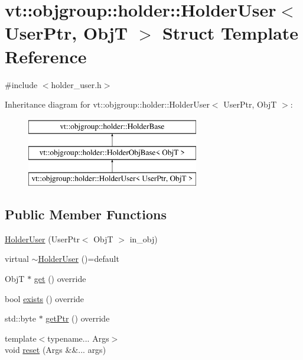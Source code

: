 \hypertarget{structvt_1_1objgroup_1_1holder_1_1_holder_user}{}\section{vt\+:\+:objgroup\+:\+:holder\+:\+:Holder\+User$<$ User\+Ptr, ObjT $>$ Struct Template Reference}
\label{structvt_1_1objgroup_1_1holder_1_1_holder_user}


{\ttfamily \#include $<$holder\+\_\+user.\+h$>$}

Inheritance diagram for vt\+:\+:objgroup\+:\+:holder\+:\+:Holder\+User$<$ User\+Ptr, ObjT $>$\+:\begin{figure}[H]
\begin{center}
\leavevmode
\includegraphics[height=3.000000cm]{structvt_1_1objgroup_1_1holder_1_1_holder_user}
\end{center}
\end{figure}
\subsection*{Public Member Functions}
\begin{DoxyCompactItemize}
\item 
\hyperlink{structvt_1_1objgroup_1_1holder_1_1_holder_user_a5c81ffca6d44450a02c9d74c650d2178}{Holder\+User} (User\+Ptr$<$ ObjT $>$ in\+\_\+obj)
\item 
virtual \hyperlink{structvt_1_1objgroup_1_1holder_1_1_holder_user_a694de38808a7075ef8fa919d9e983c8b}{$\sim$\+Holder\+User} ()=default
\item 
ObjT $\ast$ \hyperlink{structvt_1_1objgroup_1_1holder_1_1_holder_user_a102b494316b9f906a02f1c47b797e339}{get} () override
\item 
bool \hyperlink{structvt_1_1objgroup_1_1holder_1_1_holder_user_abba92cc4a99e045b64a1865fe1477fb2}{exists} () override
\item 
std\+::byte $\ast$ \hyperlink{structvt_1_1objgroup_1_1holder_1_1_holder_user_a85c5a7613142e86a830a0b5103f83ce4}{get\+Ptr} () override
\item 
{\footnotesize template$<$typename... Args$>$ }\\void \hyperlink{structvt_1_1objgroup_1_1holder_1_1_holder_user_a4a43e5b38a0474cd523ccd9aa66950e9}{reset} (Args \&\&... args)
\end{DoxyCompactItemize}
